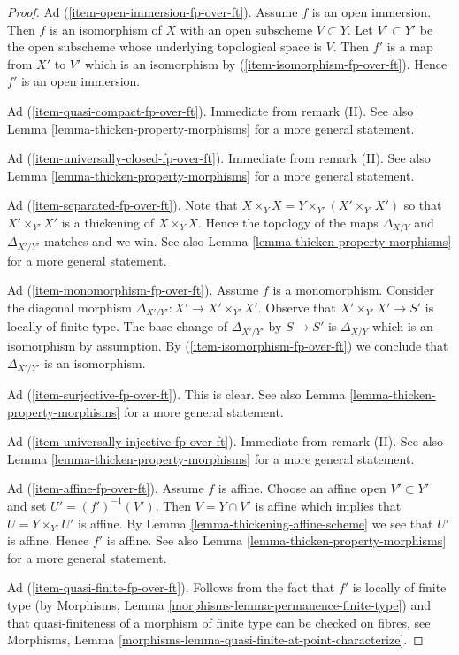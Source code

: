 \begin{proof}
\medskip\noindent
Ad (\ref{item-open-immersion-fp-over-ft}). Assume $f$ is an open immersion.
Then $f$ is an isomorphism of $X$ with an open subscheme $V \subset Y$.
Let $V' \subset Y'$ be the open subscheme whose underlying topological
space is $V$. Then $f'$ is a map from $X'$ to $V'$ which is an isomorphism by
(\ref{item-isomorphism-fp-over-ft}). Hence $f'$ is an open immersion.

\medskip\noindent
Ad (\ref{item-quasi-compact-fp-over-ft}). Immediate from remark (II). See also
Lemma \ref{lemma-thicken-property-morphisms} for a more general statement.

\medskip\noindent
Ad (\ref{item-universally-closed-fp-over-ft}). Immediate from remark (II). See
also Lemma \ref{lemma-thicken-property-morphisms} for a more general statement.

\medskip\noindent
Ad (\ref{item-separated-fp-over-ft}). Note that
$X \times_Y X = Y \times_{Y'} (X' \times_{Y'} X')$ so that
$X' \times_{Y'} X'$ is a thickening of $X \times_Y X$.
Hence the topology of the maps $\Delta_{X/Y}$ and $\Delta_{X'/Y'}$
matches and we win. See also
Lemma \ref{lemma-thicken-property-morphisms} for a more general statement.

\medskip\noindent
Ad (\ref{item-monomorphism-fp-over-ft}). Assume $f$ is a monomorphism.
Consider the diagonal morphism $\Delta_{X'/Y'} : X' \to X' \times_{Y'} X'$.
Observe that $X' \times_{Y'} X' \to S'$ is locally of finite type.
The base change of $\Delta_{X'/Y'}$ by $S \to S'$ is $\Delta_{X/Y}$
which is an isomorphism by assumption. By (\ref{item-isomorphism-fp-over-ft})
we conclude that $\Delta_{X'/Y'}$ is an isomorphism.

\medskip\noindent
Ad (\ref{item-surjective-fp-over-ft}). This is clear. See also
Lemma \ref{lemma-thicken-property-morphisms} for a more general statement.

\medskip\noindent
Ad (\ref{item-universally-injective-fp-over-ft}).
Immediate from remark (II). See also
Lemma \ref{lemma-thicken-property-morphisms} for a more general statement.

\medskip\noindent
Ad (\ref{item-affine-fp-over-ft}). Assume $f$ is affine.  Choose an
affine open $V' \subset Y'$ and set $U' = (f')^{-1}(V')$.
Then $V = Y \cap V'$ is affine which implies that
$U = Y \times_{Y'} U'$ is affine. By
Lemma \ref{lemma-thickening-affine-scheme}
we see that $U'$ is affine. Hence $f'$ is affine. See also
Lemma \ref{lemma-thicken-property-morphisms} for a more general statement.

\medskip\noindent
Ad (\ref{item-quasi-finite-fp-over-ft}). Follows from the fact that $f'$
is locally of finite type
(by Morphisms, Lemma \ref{morphisms-lemma-permanence-finite-type}) and that
quasi-finiteness of a morphism of finite type can be checked on fibres, see
Morphisms, Lemma \ref{morphisms-lemma-quasi-finite-at-point-characterize}.


\end{proof}
